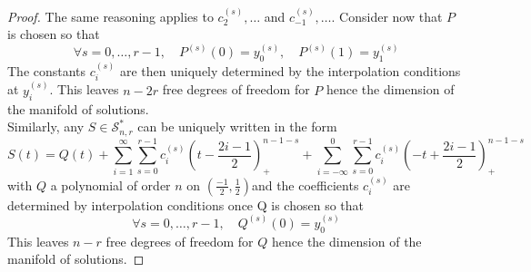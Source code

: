 \begin{proof}
  The same reasoning applies to $c_2^{(s)}, \ldots$ and $c_{-1}^{(s)}, \ldots$. Consider now that $P$ is chosen so that 
  \begin{equation*}
    \forall s=0, \ldots, r-1, \quad  P^{(s)}(0) = y^{(s)}_0, \quad P^{(s)}(1) = y^{(s)}_1
  \end{equation*}
  The constants $c_i^{(s)}$ are then uniquely determined by the interpolation conditions at $y^{(s)}_i$. This leaves 
  $n-2r$ free degrees of freedom for $P$ hence the dimension of the manifold of solutions. \\

  Similarly, any $S \in \mathscr{S}_{n,r}^{*}$ can be uniquely written in the form 
  \begin{equation*}
    S(t) = Q(t) + \sum_{i=1}^{\infty} \sum_{s=0}^{r-1} c_i^{(s)} {(t-\frac{2i-1}{2})}_+^{n-1-s} + \sum_{i=-\infty}^{0}
      \sum_{s=0}^{r-1} c_i^{(s)} {(-t+\frac{2i-1}{2})}_+^{n-1-s}
  \end{equation*}
  with $Q$ a polynomial of order $n$ on $(\frac{-1}{2}, \frac{1}{2})$and the coefficients $c_i^{(s)}$ are determined by 
  interpolation conditions once Q is chosen so that \begin{equation*}
    \forall s=0, \ldots, r-1, \quad  Q^{(s)}(0) = y^{(s)}_0
  \end{equation*}
  This leaves $n-r$ free degrees of freedom for $Q$ hence the dimension of the manifold of solutions.
\end{proof}

